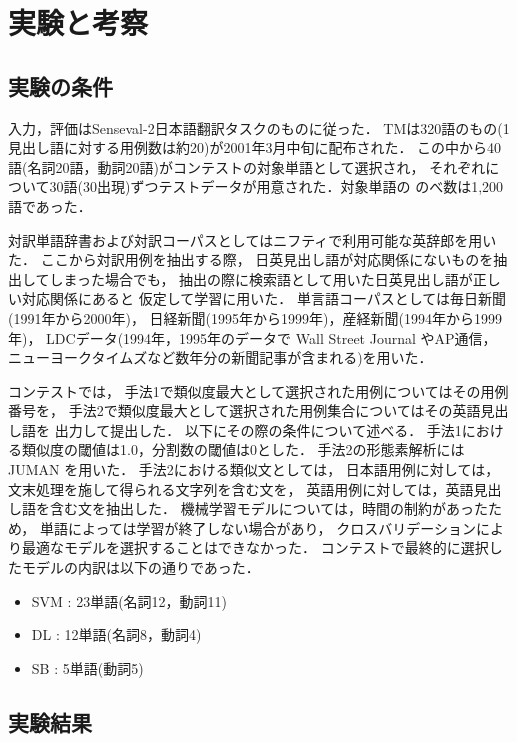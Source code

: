 \section{実験と考察}
\label{sec:experiment}

\subsection{実験の条件}
\label{sec:test}

入力，評価は{\sc Senseval-2}日本語翻訳タスクのものに従った．
TMは320語のもの(1見出し語に対する用例数は約20)が2001年3月中旬に配布された．
この中から40語(名詞20語，動詞20語)がコンテストの対象単語として選択され，
それぞれについて30語(30出現)ずつテストデータが用意された．対象単語の
のべ数は1,200語であった．

対訳単語辞書および対訳コーパスとしてはニフティで利用可能な英辞郎を用いた．
ここから対訳用例を抽出する際，
日英見出し語が対応関係にないものを抽出してしまった場合でも，
抽出の際に検索語として用いた日英見出し語が正しい対応関係にあると
仮定して学習に用いた．
単言語コーパスとしては毎日新聞(1991年から2000年)，
日経新聞(1995年から1999年)，産経新聞(1994年から1999年)，
LDCデータ(1994年，1995年のデータで Wall Street Journal やAP通信，
ニューヨークタイムズなど数年分の新聞記事が含まれる)を用いた．

コンテストでは，
手法1で類似度最大として選択された用例についてはその用例番号を，
手法2で類似度最大として選択された用例集合についてはその英語見出し語を
出力して提出した．
以下にその際の条件について述べる．
手法1における類似度の閾値は1.0，分割数の閾値は0とした．
手法2の形態素解析にはJUMAN
\cite{JUMAN3.61}
を用いた．
手法2における類似文としては，
日本語用例に対しては，
文末処理を施して得られる文字列を含む文を，
英語用例に対しては，英語見出し語を含む文を抽出した．
機械学習モデルについては，時間の制約があったため，
単語によっては学習が終了しない場合があり，
クロスバリデーションにより最適なモデルを選択することはできなかった．
コンテストで最終的に選択したモデルの内訳は以下の通りであった．

\begin{itemize}
\item SVM : 23単語(名詞12，動詞11)
\item DL : 12単語(名詞8，動詞4)
\item SB : 5単語(動詞5)
\end{itemize}

\subsection{実験結果}
\label{sec:results}

